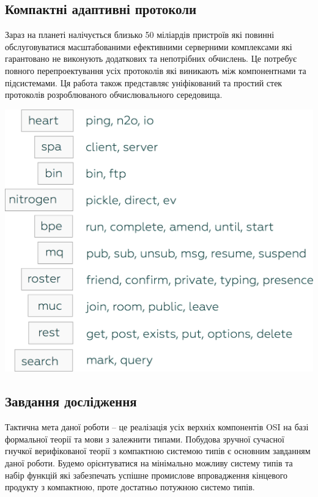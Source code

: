 \documentclass[11pt,oneside]{article}
\begin{document}
\subsection{Компактні адаптивні протоколи}

   Зараз на планеті налічується близько 50 міліардів пристроїв які повинні обслуговуватися
   масштабованими ефективними серверними комплексами які гарантовано не виконують
   додаткових та непотрібних обчислень. Це потребує повного перепроектування усіх протоколів
   які виникають між компонентнами та підсистемами. Ця работа також представляє
   уніфікований та простий стек протоколів розроблюваного обчислювального середовища.

   \begin{center}
   \vspace{0.5cm}
   \includegraphics[scale=0.15]{img/protocols}
   \end{center}

\newpage

\subsection{Завдання дослідження}
\vspace{0.5cm}

   Тактична мета даної роботи -- це реалізація усіх верхніх компонентів OSI на базі
   формальної теорії та мови з залежнити типами. Побудова зручної сучасної гнучкої верифікованої теорії
   з компактною системою типів є основним завданням даної роботи. Будемо орієнтуватися
   на мінімально можливу систему типів та набір функцій які забезпечать успішне промислове
   впровадження кінцевого продукту з компактною, проте достатньо потужною системо типів.
\end{document}
